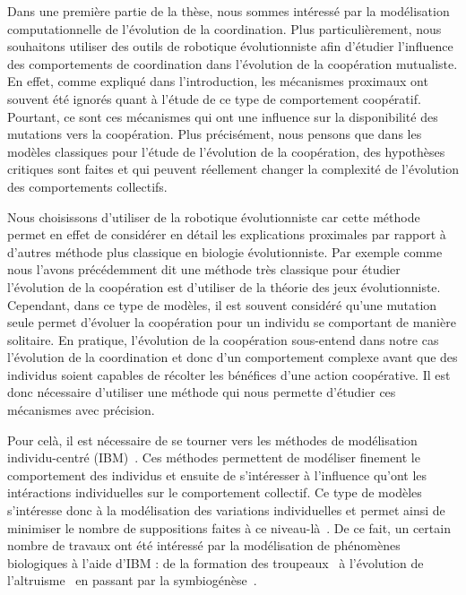 		Dans une première partie de la thèse, nous sommes intéressé par la modélisation computationnelle de l'évolution de la coordination. Plus particulièrement, nous souhaitons utiliser des outils de robotique évolutionniste afin d'étudier l'influence des comportements de coordination dans l'évolution de la coopération mutualiste. En effet, comme expliqué dans l'introduction, les mécanismes proximaux ont souvent été ignorés quant à l'étude de ce type de comportement coopératif. Pourtant, ce sont ces mécanismes qui ont une influence sur la disponibilité des mutations vers la coopération. Plus précisément, nous pensons que dans les modèles classiques pour l'étude de l'évolution de la coopération, des hypothèses critiques sont faites et qui peuvent réellement changer la complexité de l'évolution des comportements collectifs.

		Nous choisissons d'utiliser de la robotique évolutionniste car cette méthode permet en effet de considérer en détail les explications proximales par rapport à d'autres méthode plus classique en biologie évolutionniste. Par exemple comme nous l'avons précédemment dit une méthode très classique pour étudier l'évolution de la coopération est d'utiliser de la théorie des jeux évolutionniste. Cependant, dans ce type de modèles, il est souvent considéré qu'une mutation seule permet d'évoluer la coopération pour un individu se comportant de manière solitaire. En pratique, l'évolution de la coopération sous-entend dans notre cas l'évolution de la coordination et donc d'un comportement complexe avant que des individus soient capables de récolter les bénéfices d'une action coopérative. Il est donc nécessaire d'utiliser une méthode qui nous permette d'étudier ces mécanismes avec précision.

		Pour celà, il est nécessaire de se tourner vers les méthodes de modélisation individu-centré (IBM)~\parencite{Huston1988}. Ces méthodes permettent de modéliser finement le comportement des individus et ensuite de s'intéresser à l'influence qu'ont les intéractions individuelles sur le comportement collectif. Ce type de modèles s'intéresse donc à la modélisation des variations individuelles et permet ainsi de minimiser le nombre de suppositions faites à ce niveau-là~\parencite{Adami2014}. De ce fait, un certain nombre de travaux ont été intéressé par la modélisation de phénomènes biologiques à l'aide d'IBM : de la formation des troupeaux~\parencite{Olson2013a, Haley2014, Olson2016} à l'évolution de l'altruisme~\parencite{Wilder2015} en passant par la symbiogénèse~\parencite{Watson1992}.

